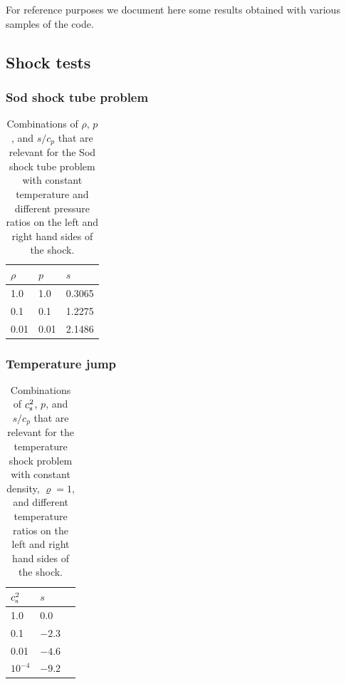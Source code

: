 \documentclass[\mydriver,12pt,twoside,notitlepage,a4paper]{article}
\begin{document}
For reference purposes we document here some results obtained with various
samples of the code.


\subsection{Shock tests}

\subsubsection{Sod shock tube problem}

\begin{table}[htb]
  \begin{center}
    \caption{
        Combinations of $\rho$, $p$, and $s/c_p$ that are relevant
        for the Sod shock tube problem with constant temperature
        and different pressure ratios on the left and right hand
        sides of the shock.
    }
    \label{Tshock1}
    \begin{tabular}{lll}
    \toprule
$\rho$  &  $p$  &  $s$  \\
    \midrule
   1.0  &  1.0  &  0.3065  \\
   0.1  &  0.1  &  1.2275  \\
   0.01 &  0.01 &  2.1486  \\
    \bottomrule
    \end{tabular}
  \end{center}
\end{table}

\subsubsection{Temperature jump}

\begin{table}[htb]
  \begin{center}
    \caption{
        Combinations of $c_{\rm s}^2$, $p$, and $s/c_p$ that are
        relevant for the temperature shock problem with constant density,
        $\varrho=1$, and different temperature ratios on the left and
        right hand sides of the shock.
    }
    \label{Tshock2}
    \begin{tabular}{lll}
    \toprule
$c_{\rm s}^2$  &  $s$  \\
    \midrule
   1.0    &$ 0.0$ \\
   0.1    &$-2.3$ \\
   0.01   &$-4.6$ \\
$10^{-4}$ &$-9.2$ \\
    \bottomrule
    \end{tabular}
  \end{center}
\end{table}
\end{document}
